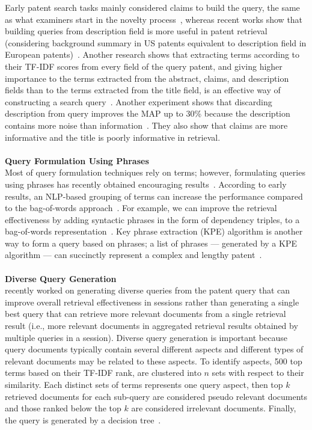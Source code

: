 Early patent search tasks mainly considered claims to build the query, the same as what examiners start in the novelty process~\citep{konishi2005query, takaki2004associative, mase2005proposal, fujii2007enhancing}, whereas recent works show that building queries from description field is more useful in patent retrieval (considering background summary in US patents equivalent to description field in European patents)~\citep{xue2009transforming, xue2009automatic, mahdabi2011building}. Another research shows that extracting terms according to their TF-IDF scores from every field of the query patent, and giving higher importance to the terms extracted from the abstract, claims, and description fields than to the terms extracted from the title field, is an effective way of constructing a search query~\citep{cetintas2012effective}. Another experiment shows that discarding description from query improves the MAP up to 30\% because the description contains more noise than information~\citep{gobeill2010simple}. They also show that claims are more informative and the title is poorly informative in retrieval.   
\\\\
\textbf{Query Formulation Using Phrases}
\ \\
Most of query formulation techniques rely on terms; however, formulating queries using phrases has recently obtained encouraging results~\citep{becks2010phrases}. According to early results, an NLP-based grouping of terms can increase the performance compared to the bag-of-words approach~\citep{osborn1997evaluating}. For example, we can improve the retrieval effectiveness by adding syntactic phrases in the form of dependency triples, to a bag-of-words representation~\citep{d2011combining}. Key phrase extraction (KPE) algorithm is another way to form a query based on phrases; a list of phrases --- generated by a KPE algorithm --- can succinctly represent a complex and lengthy patent~\citep{verma2011applying}.
\\\\
\textbf{Diverse Query Generation}
\ \\
\cite{kim2014diversifying} recently worked on generating diverse queries from the patent query that can improve overall retrieval effectiveness in sessions rather than generating a single best query that can retrieve more relevant documents from a single retrieval result (i.e., more relevant documents in aggregated retrieval results obtained by multiple queries in a session). Diverse query generation is important because query documents typically contain several different aspects and different types of relevant documents may be related to these aspects. To identify aspects, 500 top terms based on their TF-IDF rank, are clustered into $ n $ sets with respect to their similarity. Each distinct sets of terms represents one query aspect, then top $ k $ retrieved documents for each sub-query are considered pseudo relevant documents and those ranked below the top $ k $ are considered irrelevant documents. Finally, the query is generated by a decision tree~\citep{kim2014searching, kim2014diversifying}.
